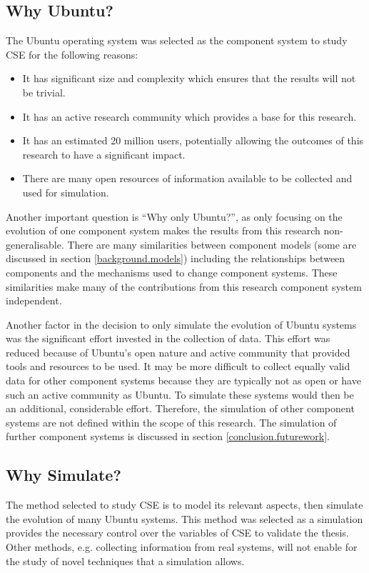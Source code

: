 \subsection{Why Ubuntu?}
The Ubuntu operating system was selected as the component system to study CSE for the following reasons:
\begin{itemize}
  \item It has significant size and complexity which ensures that the results will not be trivial.
  \item It has an active research community which provides a base for this research.
  \item It has an estimated 20 million users, potentially allowing the outcomes of this research to have a significant impact.
  \item There are many open resources of information available to be collected and used for simulation.
\end{itemize} 

Another important question is ``Why only Ubuntu?'', 
as only focusing on the evolution of one component system makes the results from this research non-generalisable.
There are many similarities between component models (some are discussed in section \ref{background.models})
including the relationships between components and the mechanisms used to change component systems.
These similarities make many of the contributions from this research component system independent.

Another factor in the decision to only simulate the evolution of Ubuntu systems was the significant effort invested in the collection of data.
This effort was reduced because of Ubuntu's open nature and active community that provided tools and resources to be used.
It may be more difficult to collect equally valid data for other component systems because they are typically not as open or have such an active community as Ubuntu.
To simulate these systems would then be an additional, considerable effort.
Therefore, the simulation of other component systems are not defined within the scope of this research.
The simulation of further component systems is discussed in section \ref{conclusion.futurework}.

\subsection{Why Simulate?}
The method selected to study CSE is to model its relevant aspects, then simulate the evolution of many Ubuntu systems.
This method was selected as a simulation provides the necessary control over the variables of CSE to validate the thesis.
Other methods, e.g. collecting information from real systems, will not enable for the study of novel techniques that a simulation allows.

